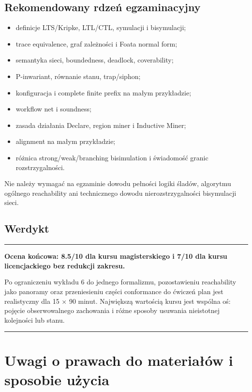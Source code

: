 \documentclass[11pt,a4paper]{article}
\newenvironment{reviewbox}
  {\par\medskip\noindent\begin{center}\begin{minipage}{0.94\textwidth}\small\textcolor{redreview}{\rule{\linewidth}{0.5pt}}\par\smallskip}
  {\par\smallskip\textcolor{redreview}{\rule{\linewidth}{0.5pt}}\end{minipage}\end{center}\medskip}
\begin{document}
\subsection{Rekomendowany rdzeń egzaminacyjny}
\begin{itemize}
\item definicje LTS/Kripke, LTL/CTL, symulacji i bisymulacji;
\item trace equivalence, graf zależności i Foata normal form;
\item semantyka sieci, boundedness, deadlock, coverability;
\item P-inwariant, równanie stanu, trap/siphon;
\item konfiguracja i complete finite prefix na małym przykładzie;
\item workflow net i soundness;
\item zasada działania Declare, region miner i Inductive Miner;
\item alignment na małym przykładzie;
\item różnica strong/weak/branching bisimulation i świadomość granic rozstrzygalności.
\end{itemize}
Nie należy wymagać na egzaminie dowodu pełności logiki śladów, algorytmu ogólnego reachability ani technicznego dowodu nierozstrzygalności bisymulacji sieci.

\subsection{Werdykt}
\begin{reviewbox}
\textbf{Ocena końcowa: 8.5/10 dla kursu magisterskiego i 7/10 dla kursu licencjackiego bez redukcji zakresu.}

Po ograniczeniu wykładu 6 do jednego formalizmu, pozostawieniu reachability jako panoramy oraz przeniesieniu części conformance do ćwiczeń plan jest realistyczny dla 15 $\times$ 90 minut. Największą wartością kursu jest wspólna oś: pojęcie obserwowalnego zachowania i różne sposoby usuwania nieistotnej kolejności lub stanu.
\end{reviewbox}

\section{Uwagi o prawach do materiałów i sposobie użycia}
\end{document}
